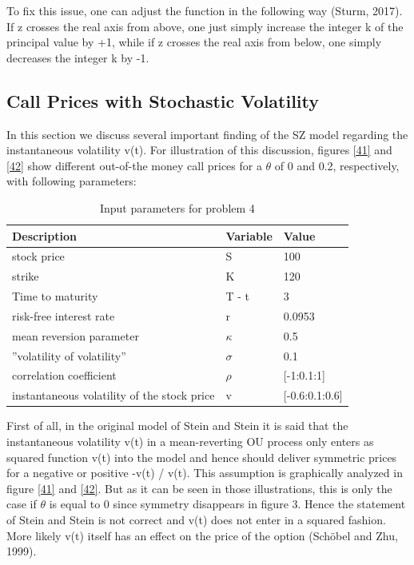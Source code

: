 \documentclass[a4paper,11pt]{article}
\begin{document}
To fix this issue, one can adjust the function in the following way (Sturm, 2017). If z crosses the real axis from above, one just simply increase the integer k of the principal value  by +1, while if z crosses the real axis from below, one simply decreases the integer k by -1. 

\subsection{Call Prices with Stochastic Volatility}
In this section we discuss several important finding of the SZ model regarding the instantaneous volatility v(t). For illustration of this discussion, figures \ref{41} and \ref{42} show different out-of-the money call prices for a $\theta$ of 0 and 0.2, respectively, with following parameters:
\begin{table}[h!]
\centering
\caption{Input parameters for problem 4}
\label{input3}
\begin{tabular}{l|l|l}
\textbf{Description} & \textbf{Variable} & \textbf{Value}  \\\hline
 stock price& S  & 100  \\
 strike& K  & 120 \\
 Time to maturity& T - t  & 3 \\
 risk-free interest rate& r & 0.0953 \\
  mean reversion parameter& $\kappa$ & 0.5  \\
 ''volatility of volatility''& $\sigma$ & 0.1 \\
   correlation coefficient& $\rho$ & [-1:0.1:1] \\
   instantaneous volatility of the stock price& v & [-0.6:0.1:0.6] \\
\end{tabular}
\end{table}

First of all, in the original model of Stein and Stein it is said that the instantaneous volatility v(t) in a mean-reverting OU process only enters as squared function v(t) into the model and hence should deliver symmetric prices for a negative or positive -v(t) / v(t). This assumption is graphically analyzed in figure \ref{41} and \ref{42}. But as it can be seen in those illustrations, this is only the case if $\theta$ is equal to 0 since symmetry disappears in figure 3. Hence the statement of Stein and Stein is not correct and v(t) does not enter in a squared fashion. More likely v(t) itself has an effect on the price of the option (Sch\"obel and Zhu, 1999).
\end{document}
